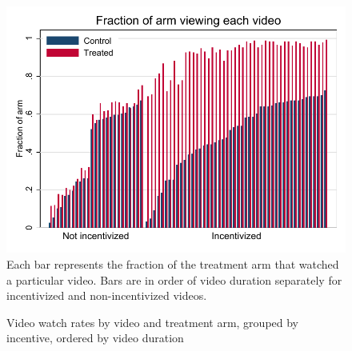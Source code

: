 \documentclass[12pt]{article}
\begin{document}
\clearpage
\begin{figure}[t]
\begin{center}
\caption{Video watch rates by video and treatment arm, grouped by incentive, ordered by video duration}
\label{video_cdf_duration}
\includegraphics[width=1\textwidth, angle=0]{../plots/bar_uviews.pdf}
\footnotesize Each bar represents the fraction of the treatment arm that watched a particular video. Bars are in order of video duration separately for incentivized and non-incentivized videos.
\end{center}
\end{figure}
\end{document}

